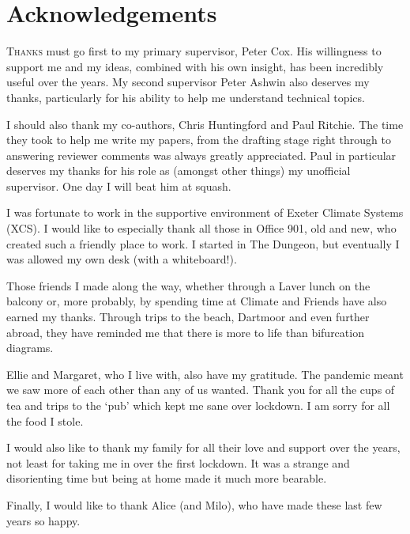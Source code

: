 \chapter{Acknowledgements}

\lettrine[lines=3,loversize=0.1,findent=0.1em,nindent=0em]{T}{hanks} must go first to my primary supervisor, Peter Cox. His willingness to support me and my ideas, combined with his own insight,
has been incredibly useful over the years. My second supervisor Peter Ashwin also deserves my thanks,
particularly for his ability to help me understand technical topics.

I should also thank my co-authors, Chris Huntingford and Paul Ritchie. The time they took to help me
write my papers, from the drafting stage right through to answering reviewer comments was always greatly appreciated. Paul
in particular deserves my thanks for his role as (amongst other things) my unofficial supervisor. One day I will beat him at squash.

I was fortunate to work in the supportive environment of Exeter Climate Systems (XCS). I would like to especially thank 
all those in Office 901, old and new, who created such a friendly place to work. I started in The Dungeon,
but eventually I was allowed my own desk (with a whiteboard!).

Those friends I made along the way, whether through a Laver lunch on the balcony or, more probably, by spending time at Climate and
Friends have also earned my thanks. Through trips to the beach, Dartmoor and even further abroad, they have reminded me that there is more to life
than bifurcation diagrams.

Ellie and Margaret, who I live with, also have my gratitude. The pandemic meant we saw more of each other than any of us wanted.
Thank you for all the cups of tea and trips to the `pub' which kept me sane over lockdown. I am sorry for
all the food I stole.

I would also like to thank my family for all their love and support over the years, not least for taking me in over the first lockdown.
It was a strange and disorienting time but being at home made it much more bearable.

Finally, I would like to thank Alice (and Milo), who have made these last few years so happy.